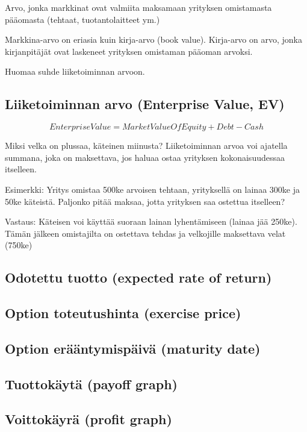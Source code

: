 \documentclass[a4paper]{article}
\begin{document}
Arvo, jonka markkinat ovat valmiita maksamaan yrityksen omistamasta pääomasta (tehtaat, tuotantolaitteet ym.)

Markkina-arvo on eriasia kuin kirja-arvo (book value). Kirja-arvo on arvo, jonka kirjanpitäjät ovat laskeneet yrityksen omistaman pääoman arvoksi.

Huomaa suhde liiketoiminnan arvoon.

\subsection{Liiketoiminnan arvo (Enterprise Value, EV)}

\[Enterprise Value = Market Value Of Equity + Debt - Cash\]

Miksi velka on plussaa, käteinen miinusta? Liiketoiminnan arvoa voi ajatella summana, joka on maksettava, jos haluaa ostaa yrityksen kokonaisuudessaa itselleen.

Esimerkki: Yritys omistaa 500ke arvoisen tehtaan, yrityksellä on lainaa 300ke ja 50ke käteistä. Paljonko pitää maksaa, jotta yrityksen saa ostettua itselleen?

Vastaus: Käteisen voi käyttää suoraan lainan lyhentämiseen (lainaa jää 250ke). Tämän jälkeen omistajilta on ostettava tehdas ja velkojille maksettava velat (750ke)

\subsection{Odotettu tuotto (expected rate of return)}

\subsection{Option toteutushinta (exercise price)}

\subsection{Option erääntymispäivä (maturity date)}

\subsection{Tuottokäytä (payoff graph)}

\subsection{Voittokäyrä (profit graph)}
\end{document}
